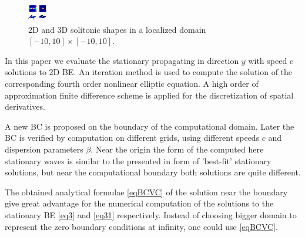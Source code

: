 \documentclass[12pt]{article}
\theoremstyle{theorem}
\theoremstyle{defi}
\begin{document}
\begin{figure}[htbp]
        \centering
              \includegraphics[width=0.98\linewidth]{figure2.eps}
        \caption{ 2D and 3D solitonic shapes in a localized domain  $[-10, 10] \times [-10, 10]$.}
	\label{fig2}
\end{figure}

	In this paper we evaluate the stationary propagating in direction $y$ with speed $c$ solutions to 2D BE. An iteration method is used to compute the solution of the corresponding fourth order nonlinear  elliptic equation. A high order of approximation finite difference scheme is applied for the discretization of spatial derivatives.

A new BC is proposed on the boundary of the computational domain. Later the BC is verified by computation on different grids, using different speeds $c$ and dispersion parameters $\beta$. Near the origin the form of the computed here stationary waves is similar to the presented in \cite{ref10} form of 'best-fit' stationary solutions, but near the computational boundary both solutions are quite different.

The obtained analytical formulae \eqref{eqBCVC} of the solution near the boundary give great advantage for the numerical computation of the solutions to the stationary BE \eqref{eq3} and \eqref{eq31} respectively. Instead of choosing bigger domain to represent the zero boundary conditions at infinity, one could use \eqref{eqBCVC}.
\end{document}

